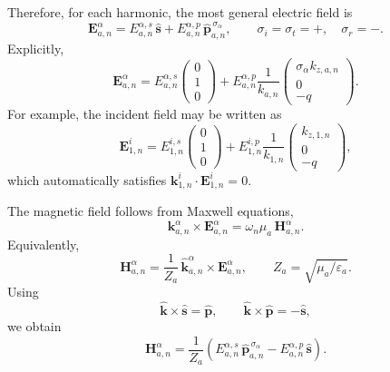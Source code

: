 \documentclass[aps, prb, superscriptaddress, longbibliography]{revtex4-2}
\renewcommand{\epsilon}{\varepsilon}
\numberwithin{equation}{section}
\begin{document}
Therefore, for each harmonic, the most general electric field is
\begin{equation}
\mathbf E^\alpha_{a,n}
=
E^{\alpha,s}_{a,n}\,\hat{\mathbf s}
+
E^{\alpha,p}_{a,n}\,\hat{\mathbf p}^{\,\sigma_\alpha}_{a,n},
\qquad
\sigma_i=\sigma_t=+,\quad \sigma_r=-.
\end{equation}
Explicitly,
\begin{equation}
\mathbf E^\alpha_{a,n}
=
E^{\alpha,s}_{a,n}\begin{pmatrix}0\\1\\0\end{pmatrix}
+
E^{\alpha,p}_{a,n}\frac{1}{k_{a,n}}
\begin{pmatrix}
\sigma_\alpha k_{z,a,n}\\
0\\
-q
\end{pmatrix}.
\end{equation}
For example, the incident field may be written as
\begin{equation}
\mathbf E^i_{1,n}
=
E^{i,s}_{1,n}\begin{pmatrix}0\\1\\0\end{pmatrix}
+
E^{i,p}_{1,n}\frac{1}{k_{1,n}}
\begin{pmatrix}
k_{z,1,n}\\
0\\
-q
\end{pmatrix},
\end{equation}
which automatically satisfies $\mathbf k^i_{1,n}\cdot \mathbf E^i_{1,n}=0$.

The magnetic field follows from Maxwell equations,
\begin{equation}
\mathbf k^\alpha_{a,n}\times \mathbf E^\alpha_{a,n}
=
\omega_n\mu_a\,\mathbf H^\alpha_{a,n}.
\end{equation}
Equivalently,
\begin{equation}
\mathbf H^\alpha_{a,n}
=
\frac{1}{Z_a}\,\hat{\mathbf k}^\alpha_{a,n}\times \mathbf E^\alpha_{a,n},
\qquad
Z_a=\sqrt{\mu_a/\epsilon_a}.
\end{equation}
Using
\begin{equation}
\hat{\mathbf k}\times \hat{\mathbf s}=\hat{\mathbf p},
\qquad
\hat{\mathbf k}\times \hat{\mathbf p}=-\hat{\mathbf s},
\end{equation}
we obtain
\begin{equation}
\mathbf H^\alpha_{a,n}
=
\frac{1}{Z_a}
\left(
E^{\alpha,s}_{a,n}\,\hat{\mathbf p}^{\,\sigma_\alpha}_{a,n}
-
E^{\alpha,p}_{a,n}\,\hat{\mathbf s}
\right).
\end{equation}
\end{document}
